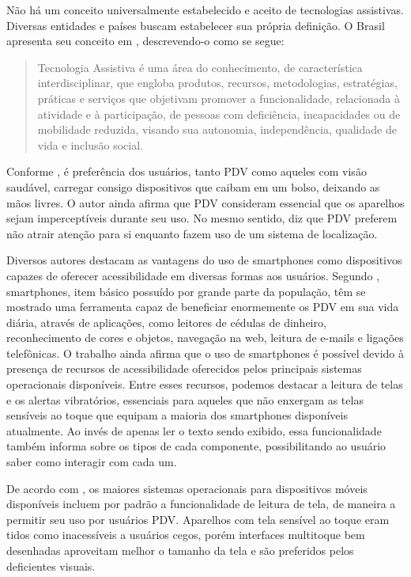 \documentclass[twoside,english,brazilian]{UNISINOSartigo}
\begin{document}
Não há um conceito universalmente estabelecido e aceito de tecnologias assistivas. Diversas entidades e países buscam estabelecer sua própria definição. O Brasil apresenta seu conceito em \cite{TA2009}, descrevendo-o como se segue:
\begin{quote}
	Tecnologia Assistiva é uma área do conhecimento, de característica interdisciplinar, que engloba produtos, recursos, metodologias, estratégias, práticas e serviços que objetivam promover a funcionalidade, relacionada à atividade e à participação, de pessoas com deficiência, incapacidades ou de mobilidade reduzida, visando sua autonomia, independência, qualidade de vida e inclusão social.
\end{quote}

Conforme , é preferência dos usuários, tanto PDV como aqueles com visão saudável, carregar consigo dispositivos que caibam em um bolso, deixando as mãos livres. O autor ainda afirma que PDV consideram essencial que os aparelhos sejam imperceptíveis durante seu uso. No mesmo sentido,  diz que PDV preferem não atrair atenção para si enquanto fazem uso de um sistema de localização.

Diversos autores destacam as vantagens do uso de smartphones como dispositivos capazes de oferecer acessibilidade em diversas formas aos usuários. Segundo , smartphones, item básico possuído por grande parte da população, têm se mostrado uma ferramenta capaz de beneficiar enormemente os PDV em sua vida diária, através de aplicações, como leitores de cédulas de dinheiro, reconhecimento de cores e objetos, navegação na web, leitura de e-mails e ligações telefônicas. O trabalho ainda afirma que o uso de smartphones é possível devido à presença de recursos de acessibilidade oferecidos pelos principais sistemas operacionais disponíveis. Entre esses recursos, podemos destacar a leitura de telas e os alertas vibratórios, essenciais para aqueles que não enxergam as telas sensíveis ao toque que equipam a maioria dos smartphones disponíveis atualmente. Ao invés de apenas ler o texto sendo exibido, essa funcionalidade também informa sobre os tipos de cada componente, possibilitando ao usuário saber como interagir com cada um.

De acordo com , os maiores sistemas operacionais para dispositivos móveis disponíveis incluem por padrão a funcionalidade de leitura de tela, de maneira a permitir seu uso por usuários PDV. Aparelhos com tela sensível ao toque eram tidos como inacessíveis a usuários cegos, porém interfaces multitoque bem desenhadas aproveitam melhor o tamanho da tela e são preferidos pelos deficientes visuais.
\end{document}
